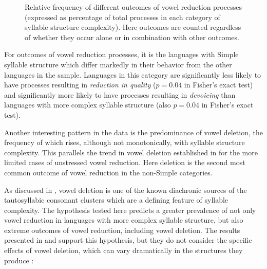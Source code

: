   
\begin{figure}
\caption{\label{fig:6.4} Relative frequency of different outcomes of vowel reduction processes (expressed as percentage of total processes in each category of syllable structure complexity). Here outcomes are counted regardless of whether they occur alone or in combination with other outcomes.}
\end{figure}

  For outcomes of vowel reduction processes, it is the languages with Simple syllable structure which differ markedly in their behavior from the other languages in the sample. Languages in this category are significantly less likely to have processes resulting in \textit{reduction in quality} ($p = 0.04$ in Fisher’s exact test) and significantly more likely to have processes resulting in \textit{devoicing} than languages with more complex syllable structure (also $p = 0.04$ in Fisher’s exact test).

  Another interesting pattern in the data is the predominance of vowel deletion, the frequency of which rises, although not monotonically, with syllable structure complexity. This parallels the trend in vowel deletion established in  for the more limited cases of unstressed vowel reduction. Here deletion is the second most common outcome of vowel reduction in the non-Simple categories. 

  As discussed in , vowel deletion is one of the known diachronic sources of the tautosyllabic consonant clusters which are a defining feature of syllable complexity. The hypothesis tested here predicts a greater prevalence of not only vowel reduction in languages with more complex syllable structure, but also extreme outcomes of vowel reduction, including vowel deletion. The results presented in  and  support this hypothesis, but they do not consider the specific effects of vowel deletion, which can vary dramatically in the structures they produce :

